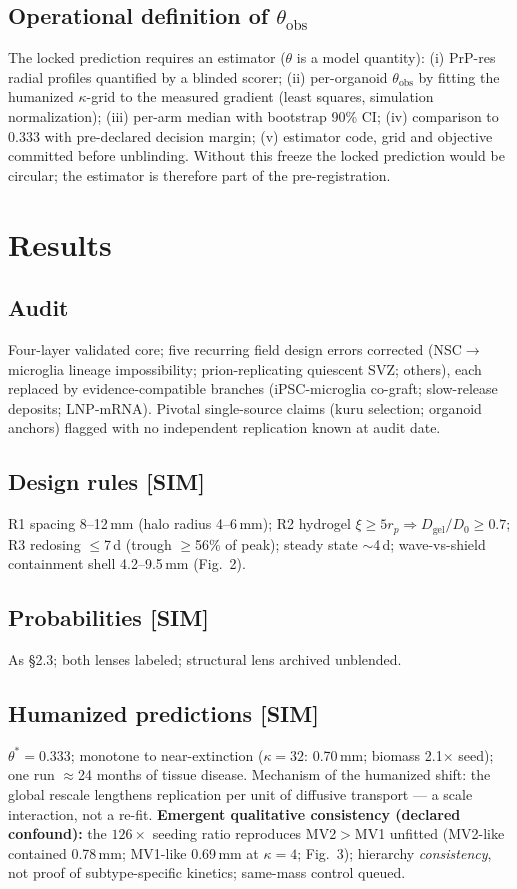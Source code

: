 \documentclass[10pt,twocolumn]{article}
\begin{document}
\subsection{Operational definition of $\theta_{\text{obs}}$}
The locked prediction requires an estimator ($\theta$ is a model quantity): (i) PrP-res radial profiles quantified by a blinded scorer; (ii) per-organoid $\theta_{\text{obs}}$ by fitting the humanized $\kappa$-grid to the measured gradient (least squares, simulation normalization); (iii) per-arm median with bootstrap 90\% CI; (iv) comparison to 0.333 with pre-declared decision margin; (v) estimator code, grid and objective committed before unblinding. Without this freeze the locked prediction would be circular; the estimator is therefore part of the pre-registration.

\section{Results}
\subsection{Audit}
Four-layer validated core; five recurring field design errors corrected (NSC$\to$microglia lineage impossibility; prion-replicating quiescent SVZ; others), each replaced by evidence-compatible branches (iPSC-microglia co-graft; slow-release deposits; LNP-mRNA). Pivotal single-source claims (kuru selection; organoid anchors) flagged with no independent replication known at audit date.

\subsection{Design rules [SIM]}
R1 spacing 8--12\,mm (halo radius 4--6\,mm); R2 hydrogel $\xi\ge5r_p\Rightarrow D_{\text{gel}}/D_0\ge0.7$; R3 redosing $\le$7\,d (trough $\ge$56\% of peak); steady state $\sim$4\,d; wave-vs-shield containment shell 4.2--9.5\,mm (Fig.~2).

\subsection{Probabilities [SIM]}
As \S2.3; both lenses labeled; structural lens archived unblended.

\subsection{Humanized predictions [SIM]}
$\theta^{*}{=}0.333$; monotone to near-extinction ($\kappa{=}32$: 0.70\,mm; biomass 2.1$\times$ seed); one run $\approx$24 months of tissue disease. Mechanism of the humanized shift: the global rescale lengthens replication per unit of diffusive transport --- a scale interaction, not a re-fit. \textbf{Emergent qualitative consistency (declared confound):} the $126\times$ seeding ratio reproduces MV2$>$MV1 unfitted (MV2-like contained 0.78\,mm; MV1-like 0.69\,mm at $\kappa{=}4$; Fig.~3); hierarchy \emph{consistency}, not proof of subtype-specific kinetics; same-mass control queued.
\end{document}
